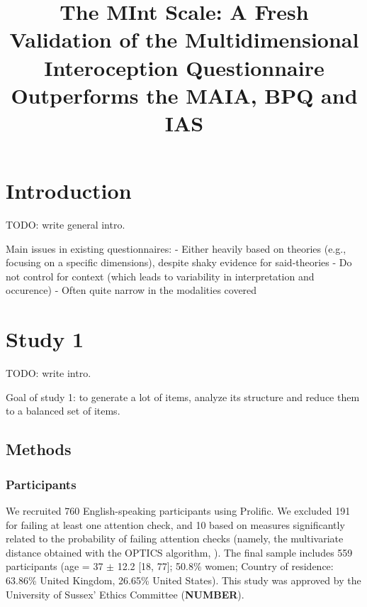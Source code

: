 \documentclass[
  jou,
  floatsintext,
  longtable,
  nolmodern,
  notxfonts,
  notimes,
  colorlinks=true,linkcolor=blue,citecolor=blue,urlcolor=blue]{apa7}
\title{\textbf{The MInt Scale: A Fresh Validation of the
Multidimensional Interoception Questionnaire Outperforms the MAIA, BPQ
and IAS}}
\begin{document}
\maketitle



\setcounter{secnumdepth}{-\maxdimen} %

\setlength\LTleft{0pt}




\section{Introduction}\label{introduction}

TODO: write general intro.

Main issues in existing questionnaires: - Either heavily based on
theories (e.g., focusing on a specific dimensions), despite shaky
evidence for said-theories - Do not control for context (which leads to
variability in interpretation and occurence) - Often quite narrow in the
modalities covered

\section{Study 1}\label{study-1}

TODO: write intro.

Goal of study 1: to generate a lot of items, analyze its structure and
reduce them to a balanced set of items.

\subsection{Methods}\label{methods}

\subsubsection{Participants}\label{participants}

We recruited 760 English-speaking participants using
Prolific\textcopyright. We excluded 191 for failing at least one
attention check, and 10 based on measures significantly related to the
probability of failing attention checks (namely, the multivariate
distance obtained with the OPTICS algorithm,
). The final
sample includes 559 participants (age = 37 \(\pm\) 12.2 {[}18, 77{]};
50.8\% women; Country of residence: 63.86\% United Kingdom, 26.65\%
United States). This study was approved by the University of Sussex'
Ethics Committee (\textbf{NUMBER}).
\end{document}
